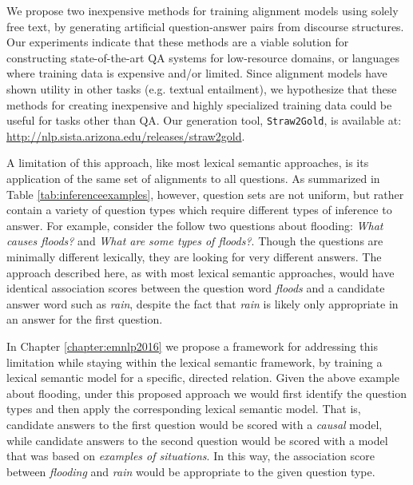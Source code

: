 We propose two inexpensive methods for training alignment models using solely free text, by generating artificial question-answer pairs from discourse structures. 
Our experiments indicate that these methods are a viable solution for constructing state-of-the-art QA systems for low-resource domains, or languages where training data is expensive and/or limited.  Since alignment models have shown utility in other tasks (e.g. textual entailment), we hypothesize that these methods for creating inexpensive and highly specialized training data could be useful for tasks other than QA.  
Our generation tool, {\tt Straw2Gold}, is available at: {\small \url{http://nlp.sista.arizona.edu/releases/straw2gold}}.

A limitation of this approach, like most lexical semantic approaches, is its application of the same set of alignments to all questions.  As summarized in Table \ref{tab:inferenceexamples}, however, question sets are not uniform, but rather contain a variety of question types which require different types of inference to answer.  
For example, consider the follow two questions about flooding: \textit{What causes floods?} and \textit{What are some types of floods?}.  Though the questions are minimally different lexically, they are looking for very different answers.  The approach described here, as with most lexical semantic approaches, would have identical association scores between the question word \textit{floods} and a candidate answer word such as \textit{rain}, despite the fact that \textit{rain} is likely only appropriate in an answer for the first question.

In Chapter \ref{chapter:emnlp2016} we propose a framework for addressing this limitation while staying within the lexical semantic framework, by training a lexical semantic model for a specific, directed relation.  Given the above example about flooding, under this proposed approach we would first identify the question types and then apply the corresponding lexical semantic model.  That is, candidate answers to the first question would be scored with a \textit{causal} model, while candidate answers to the second question would be scored with a model that was based on \textit{examples of situations}.  In this way, the association score between \textit{flooding} and \textit{rain} would be appropriate to the given question type.


